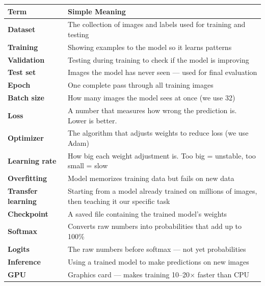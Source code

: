 \documentclass[11pt]{article}
\begin{document}
\begin{table}[H]
    \centering
    \renewcommand{\arraystretch}{1.4}
    \begin{tabular}{p{3.5cm}p{10cm}}
        \toprule
        \textbf{Term} & \textbf{Simple Meaning} \\
        \midrule
        \textbf{Dataset} & The collection of images and labels used for training and testing \\
        \textbf{Training} & Showing examples to the model so it learns patterns \\
        \textbf{Validation} & Testing during training to check if the model is improving \\
        \textbf{Test set} & Images the model has never seen --- used for final evaluation \\
        \textbf{Epoch} & One complete pass through all training images \\
        \textbf{Batch size} & How many images the model sees at once (we use 32) \\
        \textbf{Loss} & A number that measures how wrong the prediction is. Lower is better. \\
        \textbf{Optimizer} & The algorithm that adjusts weights to reduce loss (we use Adam) \\
        \textbf{Learning rate} & How big each weight adjustment is. Too big = unstable, too small = slow \\
        \textbf{Overfitting} & Model memorizes training data but fails on new data \\
        \textbf{Transfer learning} & Starting from a model already trained on millions of images, then teaching it our specific task \\
        \textbf{Checkpoint} & A saved file containing the trained model's weights \\
        \textbf{Softmax} & Converts raw numbers into probabilities that add up to 100\% \\
        \textbf{Logits} & The raw numbers before softmax --- not yet probabilities \\
        \textbf{Inference} & Using a trained model to make predictions on new images \\
        \textbf{GPU} & Graphics card --- makes training 10--20$\times$ faster than CPU \\
        \bottomrule
    \end{tabular}
\end{table}
\end{document}
